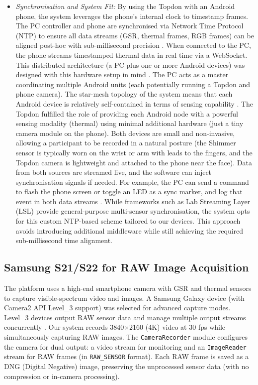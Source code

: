\begin{itemize}
    \item \emph{Synchronisation and System Fit:} By using the Topdon with an Android phone, the system leverages the phone's internal clock to timestamp frames. The PC controller and phone are synchronised via Network Time Protocol (NTP) to ensure all data streams (GSR, thermal frames, RGB frames) can be aligned post-hoc with sub-millisecond precision \cite{ref15}. When connected to the PC, the phone streams timestamped thermal data in real time via a WebSocket. This distributed architecture (a PC plus one or more Android devices) was designed with this hardware setup in mind \cite{ref15}. The PC acts as a master coordinating multiple Android units (each potentially running a Topdon and phone camera). The star-mesh topology of the system means that each Android device is relatively self-contained in terms of sensing capability \cite{ref15}. The Topdon fulfilled the role of providing each Android node with a powerful sensing modality (thermal) using minimal additional hardware (just a tiny camera module on the phone). Both devices are small and non-invasive, allowing a participant to be recorded in a natural posture (the Shimmer sensor is typically worn on the wrist or arm with leads to the fingers, and the Topdon camera is lightweight and attached to the phone near the face). Data from both sources are streamed live, and the software can inject synchronisation signals if needed. For example, the PC can send a command to flash the phone screen or toggle an LED as a sync marker, and log that event in both data streams \cite{ref21}. While frameworks such as Lab Streaming Layer (LSL) \cite{ref9} provide general-purpose multi-sensor synchronisation, the system opts for this custom NTP-based scheme tailored to our devices. This approach avoids introducing additional middleware while still achieving the required sub-millisecond time alignment.
\end{itemize}

\subsection{Samsung S21/S22 for RAW Image Acquisition}
The platform uses a high-end smartphone camera with GSR and thermal sensors to capture visible-spectrum video and images. A Samsung Galaxy device (with Camera2 API Level\_3 support) was selected for advanced capture modes. Level\_3 devices output RAW sensor data and manage multiple output streams concurrently \cite{ref13}. Our system records 3840$\times$2160 (4K) video at 30 fps while simultaneously capturing RAW images. The \texttt{CameraRecorder} module configures the camera for dual output: a video stream for monitoring and an \texttt{ImageReader} stream for RAW frames (in \texttt{RAW\_SENSOR} format). Each RAW frame is saved as a DNG (Digital Negative) image, preserving the unprocessed sensor data (with no compression or in-camera processing).

